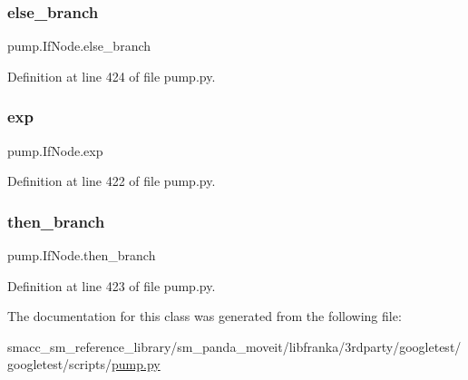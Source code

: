 \subsubsection{\texorpdfstring{else\+\_\+branch}{else\_branch}}
{\footnotesize\ttfamily pump.\+If\+Node.\+else\+\_\+branch}



Definition at line 424 of file pump.\+py.

\mbox{\label{classpump_1_1IfNode_a92042e4262196ffd7366350539f512d8}} 
\subsubsection{\texorpdfstring{exp}{exp}}
{\footnotesize\ttfamily pump.\+If\+Node.\+exp}



Definition at line 422 of file pump.\+py.

\mbox{\label{classpump_1_1IfNode_aa9e2e488564629f8dc0d64d165a19ffa}} 
\subsubsection{\texorpdfstring{then\+\_\+branch}{then\_branch}}
{\footnotesize\ttfamily pump.\+If\+Node.\+then\+\_\+branch}



Definition at line 423 of file pump.\+py.



The documentation for this class was generated from the following file\+:\begin{DoxyCompactItemize}
\item 
smacc\+\_\+sm\+\_\+reference\+\_\+library/sm\+\_\+panda\+\_\+moveit/libfranka/3rdparty/googletest/googletest/scripts/\hyperlink{pump_8py}{pump.\+py}\end{DoxyCompactItemize}
